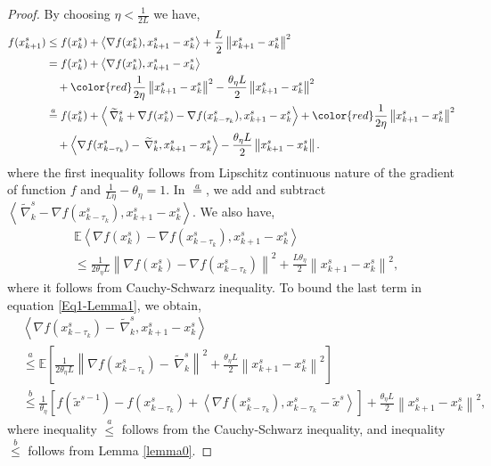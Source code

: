 \documentclass[10pt, conference, compsocconf]{IEEEtran}
\newcommand*{\E}{\mathbb{E}}
\newcommand*{\VRG}{\,\widetilde{\nabla}_k^s}
\newcommand{\norm}[1]{\left\lVert#1\right\rVert}
\newcommand{\Iprod}[2]{\left\langle #1,#2\right\rangle}
\theoremstyle{definition}
\theoremstyle{remark}
\begin{document}
\begin{proof}
By choosing $\eta < \frac{1}{2L}$ we have,
\begin{equation}\label{Eq1-Lemma1}
\begin{split}
f(x_{k+1}^s) & \leq f(x_{k}^s) + \Iprod{\nabla f(x_{k}^s)}{x_{k+1}^s-x_{k}^s}+\frac{L}{2}\norm{x_{k+1}^s-x_{k}^s}^2\\
&=f(x_{k}^s) + \Iprod{\nabla f(x_{k}^s)}{x_{k+1}^s-x_{k}^s}\\
&~~~+ {\color{red}\frac{1 }{2\eta}}\norm{x_{k+1}^s-x_{k}^s}^2-\frac{\theta_{\eta} L}{2}\norm{x_{k+1}^s-x_{k}^s}^2\\
&\stackrel{a}{=}f(x_{k}^s) + \Iprod{\VRG+\nabla f(x_{k}^s)-\nabla f(x_{k-\tau_k}^s)}{x_{k+1}^s-x_{k}^s} + {\color{red} \frac{1}{2\eta}}\norm{x_{k+1}^s-x_{k}^s}^2\\
&~~~+\Iprod{\nabla f(x_{k-\tau_k}^s)-\VRG}{x_{k+1}^s-x_{k}^s}-\frac{\theta_{\eta} L}{2}\norm{x_{k+1}^s-x_{k}^s}.
\end{split}
\end{equation}
where the first inequality follows from Lipschitz continuous nature of the gradient of function $f$ and $\frac{1}{L\eta}-\theta_{\eta}=1$. In $\stackrel{a}{=}$, we add and subtract $\Iprod{\VRG-\nabla f(x_{k-\tau_k}^s)}{x_{k+1}^s-x_{k}^s}$. We also have,
\begin{equation}\label{Eq2-Lemma3}
\begin{split}
& \E\Iprod{\nabla f(x_{k}^s)-\nabla f(x_{k-\tau_k}^s)}{x_{k+1}^s-x_{k}^s}\\
&\leq \frac{1}{2 \theta_{\eta} L} \norm{\nabla f(x_{k}^s)-\nabla f(x_{k-\tau_k}^s)}^2+ \frac{L\theta_{\eta}}{2}\norm{x_{k+1}^s-x_{k}^s}^2,
\end{split}
\end{equation}
where it follows from Cauchy-Schwarz inequality. To bound the last term in equation \eqref{Eq1-Lemma1}, we obtain,
\begin{equation}\label{Eq2-Lemma1}
\begin{split}
&\Iprod{\nabla f(x_{k-\tau_{k}}^s)-\VRG}{x_{k+1}^s-x_{k}^s}\\
&\stackrel{a}{\leq} \E\left[\frac{1}{2\theta_{\eta} L}\norm{\nabla f(x_{k-\tau_{k}}^s)-\VRG}^2 + \frac{\theta_{\eta} L}{2}\norm{x_{k+1}^s-x_{k}^s}^2\right]\\
&\stackrel{b}{\leq} \frac{1}{\theta_{\eta}}\left[f(\widetilde{x}^{s-1})-f(x_{k-\tau_k}^s)+\Iprod{\nabla f(x_{k-\tau_k}^s)}{x_{k-\tau_k}^s-\widetilde{x}^s}\right]+ \frac{\theta_{\eta} L}{2}\norm{x_{k+1}^{s}-x_{k}^s}^2,
\end{split}
\end{equation}
where inequality $\stackrel{a}{\leq}$ follows from the Cauchy-Schwarz inequality, and inequality $\stackrel{b}{\leq}$ follows from Lemma \ref{lemma0}. 




\end{proof}
\end{document}

